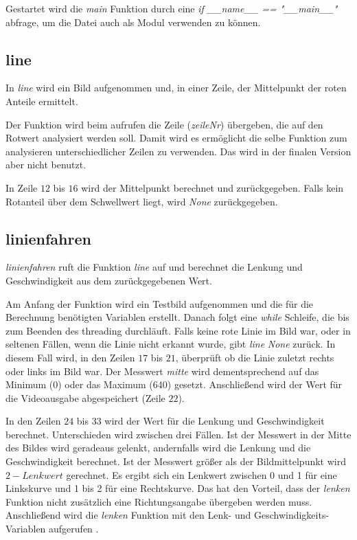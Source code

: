 \documentclass[a4paper, 12pt]{scrartcl}
\begin{document}
Gestartet wird die \textit{main} Funktion durch eine \textit{if \_\_name\_\_ == "\_\_main\_\_"} abfrage, um die Datei auch als Modul verwenden zu können.



\subsection{line}	%


In \textit{line} wird ein Bild aufgenommen und, in einer Zeile, der Mittelpunkt der roten Anteile ermittelt.

Der Funktion wird beim aufrufen die Zeile (\textit{zeileNr}) übergeben, die auf den Rotwert analysiert werden soll. Damit wird es ermöglicht die selbe Funktion zum analysieren unterschiedlicher Zeilen zu verwenden. Das wird in der finalen Version aber nicht benutzt.

In Zeile $12$ bis $16$ wird der Mittelpunkt berechnet und zurückgegeben. Falls kein Rotanteil über dem Schwellwert liegt, wird \textit{None} zurückgegeben.

\subsection{linienfahren}	%


\textit{linienfahren} ruft die Funktion \textit{line} auf und berechnet die Lenkung und Geschwindigkeit aus dem zurückgegebenen Wert.

Am Anfang der Funktion wird ein Testbild aufgenommen und die für die Berechnung benötigten Variablen erstellt. Danach folgt eine \textit{while} Schleife, die bis zum Beenden des threading durchläuft.
Falls keine rote Linie im Bild war, oder in seltenen Fällen, wenn die Linie nicht erkannt wurde, gibt \textit{line} \textit{None} zurück. In diesem Fall wird, in den Zeilen $17$ bis $21$, überprüft ob die Linie zuletzt rechts oder links im Bild war. Der Messwert \textit{mitte} wird dementsprechend auf das Minimum (0) oder das Maximum (640) gesetzt. Anschließend wird der Wert für die Videoausgabe abgespeichert (Zeile $22$).

In den Zeilen $24$ bis $33$ wird der Wert für die Lenkung und Geschwindigkeit berechnet. Unterschieden wird zwischen drei Fällen. Ist der Messwert in der Mitte des Bildes wird geradeaus gelenkt, andernfalls wird die Lenkung und die Geschwindigkeit berechnet. Ist der Messwert größer als der Bildmittelpunkt wird $2-\textit{Lenkwert}$ gerechnet. Es ergibt sich ein Lenkwert zwischen 0 und 1 für eine Linkskurve und 1 bis 2 für eine Rechtskurve. Das hat den Vorteil, dass der \textit{lenken} Funktion nicht zusätzlich eine Richtungsangabe übergeben werden muss. Anschließend wird die \textit{lenken} Funktion mit den Lenk- und Geschwindigkeits-Variablen aufgerufen .\\
\end{document}
